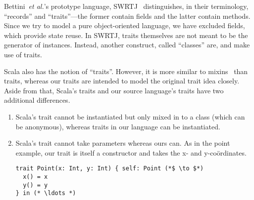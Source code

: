 Bettini~\textit{et al.}'s prototype language,
SWRTJ~\cite{bettini2010prototypical} distinguishes, in their terminology,
``records'' and ``traits''---the former contain fields and the latter contain
methods. Since we try to model a pure object-oriented language, we have excluded
fields, which provide state reuse. In SWRTJ, traits themselves are not meant to
be the generator of instances. Instead, another construct, called ``classes''
are, and make use of traits.


Scala also has the notion of ``traits''. However, it is more similar to
mixins~\cite{bracha1990mixin} than traits, whereas our traits are intended to
model the original trait idea closely. Aside from that, Scala's traits and our
source language's traits have two additional differences.

\begin{enumerate}

  \item Scala's trait cannot be instantiated but only mixed in to a class (which
  can be anonymous), whereas traits in our language can be instantiated.

  \item Scala's trait cannot take parameters whereas ours can. As in the point
  example, our trait is itself a constructor and takes the x- and y-coördinates.

\begin{lstlisting}
trait Point(x: Int, y: Int) { self: Point (*$ \to $*)
  x() = x
  y() = y
} in (* \ldots *)
\end{lstlisting}

\end{enumerate}
